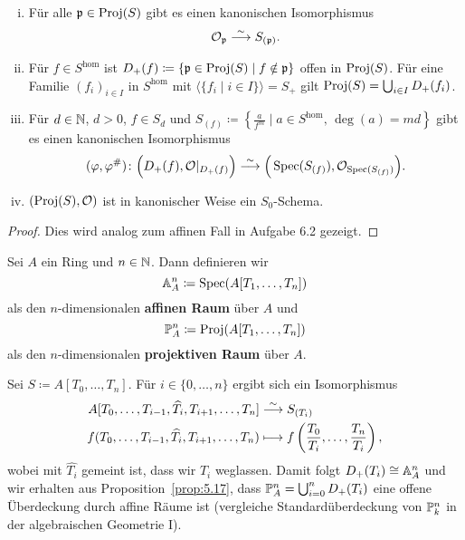 \begin{prop}
\label{prop:5.17}
	\begin{enumerate}[i)]
		\item Für alle $\mfp \in \Proj(S)$ gibt es einen kanonischen Isomorphismus
		\[
			\mco_\mfp \simto S_{(\mfp)}.
		\]
		\item Für $f \in S^{\text{hom}}$ ist $D_+(f) \coloneqq \{\mfp \in \Proj(S) \mid f \notin \mfp\}$ offen in $\Proj(S)$. Für eine Familie $(f_i)_{i\in I}$ in $S^{\text{hom}}$ mit $\langle\{f_i\mid i\in I\}\rangle = S_+$ gilt $\Proj(S) = \bigcup_{i\in I} D_+(f_i)$.
		\item Für $d \in \N$, $d>0$, $f \in S_d$ und $S_{(f)} \coloneqq \left\lbrace \frac{a}{f^m}\mid a \in S^{\text{hom}},\, \deg(a) = md\right\rbrace$ gibt es einen kanonischen Isomorphismus
		\[
			(\varphi, \varphi^{\#})\colon\Big(D_+(f),\mco\vert_{D_+(f)}\Big)\simto \Big(\Spec(S_{(f)}),\mco_{\Spec(S_{(f)})}\Big).
		\]
		\item $(\Proj(S),\mco)$ ist in kanonischer Weise ein $S_0$-Schema.
	\end{enumerate}
	\begin{proof}
		Dies wird analog zum affinen Fall in Aufgabe 6.2 gezeigt.
	\end{proof}
\end{prop}

\begin{defn}
\label{defn:5.18}
	Sei $A$ ein Ring und $n \in \N$. Dann definieren wir
	\[
		\A^n_A \coloneqq \Spec(A[T_1,\ldots,T_n])
	\]
	als den $n$-dimensionalen \textbf{affinen Raum} über $A$ und
	\[
		\P^n_A \coloneqq \Proj(A[T_1,\ldots,T_n])
	\]
	als den $n$-dimensionalen \textbf{projektiven Raum} über $A$.
\end{defn}
\begin{bsp}
\label{bsp:5.19}
	Sei $S \coloneqq A[T_0,\ldots,T_n]$. Für $i \in \{0,\ldots,n\}$ ergibt sich ein Isomorphismus
	\begin{align*}
		A[T_0,\ldots,T_{i-1},\widehat{T_i},T_{i+1},\ldots,T_n] & \simto S_{(T_i)}\\
		f(T_0,\ldots,T_{i-1},\widehat{T_i},T_{i+1},\ldots,T_n) & \longmapsto f\left(\frac{T_0}{T_i},\ldots,\frac{T_n}{T_i}\right),
	\end{align*}
	wobei mit $\widehat{T_i}$ gemeint ist, dass wir $T_i$ weglassen. Damit folgt $D_+(T_i) \cong \A^n_A$ und wir erhalten aus Proposition~\ref{prop:5.17}, dass $\P^n_A = \bigcup_{i=0}^n D_+(T_i)$ eine offene Überdeckung durch affine Räume ist (vergleiche Standardüberdeckung von $\P^n_k$ in der algebraischen Geometrie I).
\end{bsp}
